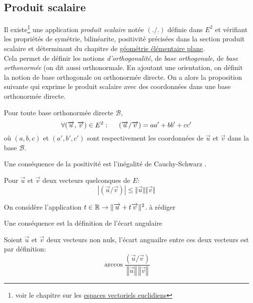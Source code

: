 \subsection{Produit scalaire}
 Il existe\footnote{voir le chapitre sur les \href{\baseurl C2262.pdf}{espaces vectoriels euclidiens}} une application \emph{produit scalaire} notée $(./.)$ définie dans $E^2$ et vérifiant les propriétés de symétrie, bilinéarite, positivité précisées dans la section produit scalaire et déterminant du chapitre de \href{\baseurl C2005.pdf}{géométrie élémentaire plane}.\\
Cela permet de définir les notions \emph{d'orthogonalité}, de \emph{base orthogonale}, de \emph{base orthonormée} (on dit aussi orthonormale. En ajoutant une orientation, on définit la notion de base orthogonale ou orthonormée directe. On a alors la proposition suivante qui exprime le produit scalaire avec des coordonnées dans une base orthonormée directe.
\begin{prop}
 Pour toute base orthonormée directe $\mathcal{B}$,
\begin{displaymath}
\forall (\overrightarrow{u},\overrightarrow{v})\in E^2 :\hspace{0.5cm}
\left( \overrightarrow{u}/\overrightarrow{v}\right) = aa' + bb' + cc'
\end{displaymath}
où $(a,b,c)$ et $(a',b',c')$ sont respectivement les coordonnées de $\overrightarrow{u}$ et $\overrightarrow{v}$ dans la base $\mathcal B$.
\end{prop}
Une conséquence de la positivité est l'inégalité de Cauchy-Schwarz .
\begin{prop}
 Pour $\overrightarrow u$ et $\overrightarrow v$ deux vecteurs quelconques de $E$:
\begin{displaymath}
 |(\overrightarrow u / \overrightarrow v)|\leq \Vert \overrightarrow u \Vert \Vert \overrightarrow v \Vert
\end{displaymath}
\end{prop}
\begin{demo}
 On considère l'application $t\in \mathbb{R} \rightarrow \Vert \overrightarrow u +t \overrightarrow v \Vert^2$.\newline
à rédiger
\end{demo}
Une conséquence est la définition de l'écart angulaire 
\begin{defi}
  Soient $\overrightarrow{u}$ et $\overrightarrow{v}$ deux vecteurs non nuls, l'écart anguailre entre ces deux vecteurs est par définition:
\begin{displaymath}
 \arccos\dfrac{(\overrightarrow{u}/\overrightarrow{v})}{ \left\Vert \overrightarrow{u} \right\Vert \, \left\Vert \overrightarrow{v} \right\Vert}
\end{displaymath}
\end{defi}


